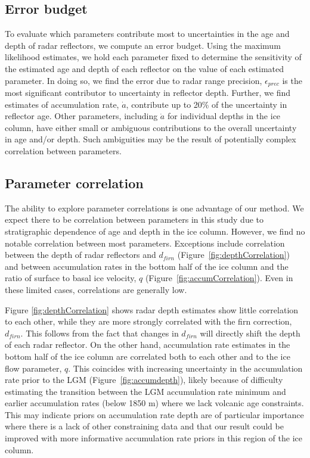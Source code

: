 \subsection{Error budget}
To evaluate which parameters contribute most to uncertainties in the age and depth of radar reflectors, we compute an error budget. Using the maximum likelihood estimates, we hold each parameter fixed to determine the sensitivity of the estimated age and depth of each reflector on the value of each estimated parameter. In doing so, we find the error due to radar range precision, $\epsilon_{prec}$ is the most significant contributor to uncertainty in reflector depth. Further, we find estimates of accumulation rate, $\dot{a}$, contribute up to 20\% of the uncertainty in reflector age. Other parameters, including $\dot{a}$ for individual depths in the ice column, have either small or ambiguous contributions to the overall uncertainty in age and/or depth. Such ambiguities may be the result of potentially complex correlation between parameters. 


\subsection{Parameter correlation}\label{sec:ke}
The ability to explore parameter correlations is one advantage of our method. We expect there to be correlation between parameters in this study due to stratigraphic dependence of age and depth in the ice column. However, we find no notable correlation between most parameters. Exceptions include correlation between the depth of radar reflectors and $d_{firn}$ (Figure~\ref{fig:depthCorrelation}) and between accumulation rates in the bottom half of the ice column and the ratio of surface to basal ice velocity, $q$ (Figure~\ref{fig:accumCorrelation}). Even in these limited cases, correlations are generally low.



Figure \ref{fig:depthCorrelation} shows radar depth estimates show little correlation to each other, while they are more strongly correlated with the firn correction, $d_{firn}$. This follows from the fact that changes in $d_{firn}$ will directly shift the depth of each radar reflector. On the other hand, accumulation rate estimates in the bottom half of the ice column are correlated both to each other and to the ice flow parameter, $q$. This coincides with increasing uncertainty in the accumulation rate prior to the LGM (Figure~\ref{fig:accumdepth}), likely because of difficulty estimating the transition between the LGM accumulation rate minimum and earlier accumulation rates (below 1850 m) where we lack volcanic age constraints. This may indicate priors on accumulation rate depth are of particular importance where there is a lack of other constraining data and that our result could be improved with more informative accumulation rate priors in this region of the ice column.

